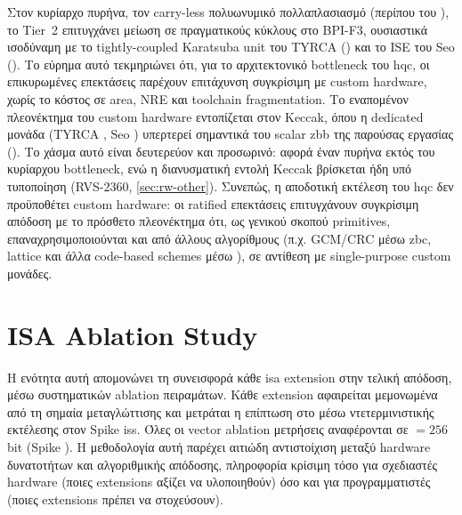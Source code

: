 \begin{table}[htbp]
  \centering
  \captionsetup{list=no}
  \caption{Επιτάχυνση σε επίπεδο πυρήνα: ratified RISC-V ISA.}
  \label{tab:ratified-vs-custom}
  \small
  
\end{table}

Στον κυρίαρχο πυρήνα, τον carry-less πολυωνυμικό πολλαπλασιασμό (περίπου
 του \Decaps), το Tier~2 επιτυγχάνει μείωση  σε πραγματικούς κύκλους στο BPI-F3,
ουσιαστικά ισοδύναμη με το tightly-coupled Karatsuba unit του TYRCA
() και το  ISE του Seo (). Το εύρημα
αυτό τεκμηριώνει ότι, για το αρχιτεκτονικό bottleneck του \gls{hqc}, οι
επικυρωμένες επεκτάσεις παρέχουν επιτάχυνση συγκρίσιμη με custom hardware,
χωρίς το κόστος σε area, NRE και toolchain fragmentation. Το εναπομένον
πλεονέκτημα του custom hardware εντοπίζεται στον Keccak, όπου η dedicated
μονάδα (TYRCA , Seo ) υπερτερεί σημαντικά του scalar
\gls{zbb} της παρούσας εργασίας (). Το χάσμα αυτό είναι δευτερεύον
και προσωρινό: αφορά έναν πυρήνα εκτός του κυρίαρχου bottleneck, ενώ η
διανυσματική εντολή Keccak βρίσκεται ήδη υπό τυποποίηση (RVS-2360,
\cref{sec:rw-other}). Συνεπώς, η αποδοτική εκτέλεση του \gls{hqc} δεν
προϋποθέτει custom hardware: οι ratified επεκτάσεις επιτυγχάνουν συγκρίσιμη
απόδοση με το πρόσθετο πλεονέκτημα ότι, ως γενικού σκοπού primitives,
επαναχρησιμοποιούνται και από άλλους αλγορίθμους (π.χ. GCM/CRC μέσω \gls{zbc},
lattice και άλλα code-based schemes μέσω \RVV), σε αντίθεση με single-purpose
custom μονάδες.

\ifTODO
\section{ISA Ablation Study}
\label{sec:isa-ablation}

Η ενότητα αυτή απομονώνει τη συνεισφορά κάθε \gls{isa} extension στην
τελική απόδοση, μέσω συστηματικών ablation πειραμάτων. Κάθε extension
αφαιρείται μεμονωμένα από τη  σημαία μεταγλώττισης και
μετράται η επίπτωση στο \instret μέσω ντετερμινιστικής εκτέλεσης στον
Spike \gls{iss}. Όλες οι vector ablation μετρήσεις αναφέρονται σε \VLEN $= \num{256}$ bit (Spike ). Η μεθοδολογία αυτή παρέχει αιτιώδη αντιστοίχιση μεταξύ
hardware δυνατοτήτων και αλγοριθμικής απόδοσης, πληροφορία κρίσιμη τόσο
για σχεδιαστές hardware (ποιες extensions αξίζει να υλοποιηθούν) όσο και
για προγραμματιστές (ποιες extensions πρέπει να στοχεύσουν).

